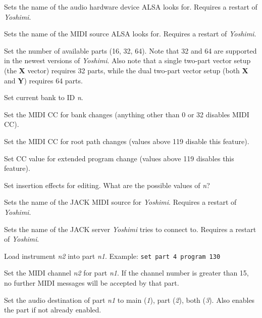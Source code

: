       Sets the name of the audio hardware device ALSA looks for.
      Requires a restart of \textsl{Yoshimi}.

      Sets the name of the MIDI source ALSA looks for.
      Requires a restart of \textsl{Yoshimi}.

      Set the number of available parts (16, 32, 64).
      Note that 32 and 64 are supported in the newest versions of
      \textsl{Yoshimi}.  Also note that a single two-part vector setup (the
      \textbf{X} vector) requires 32 parts, while the dual two-part vector
      setup (both \textbf{X} and \textbf{Y}) requires 64 parts.

      Set current bank to ID \textsl{n}.

      Set the MIDI CC for bank changes (anything other than 0 or 32
      disables MIDI CC).

      Set the MIDI CC for root path changes (values above 119 disable this
      feature).

      Set CC value for extended program change (values above 119 disables this
      feature).

      Set insertion effects for editing.
      What are the possible values of \textsl{n}?

      Sets the name of the JACK MIDI source for \textsl{Yoshimi}.
      Requires a restart of \textsl{Yoshimi}.

      Sets the name of the JACK server \textsl{Yoshimi} tries to connect to.
      Requires a restart of \textsl{Yoshimi}.

      Load instrument \textsl{n2} into part \textsl{n1}.
      Example: \texttt{set part 4 program 130}

      Set the MIDI channel \textsl{n2} for part \textsl{n1}.
      If the channel number is greater than 15, no further MIDI
      messages will be accepted by that part.

      Set the audio destination of part \textsl{n1}
      to main (\textsl{1}), part (\textsl{2}), both (\textsl{3}).
      Also enables the part if not already enabled.

